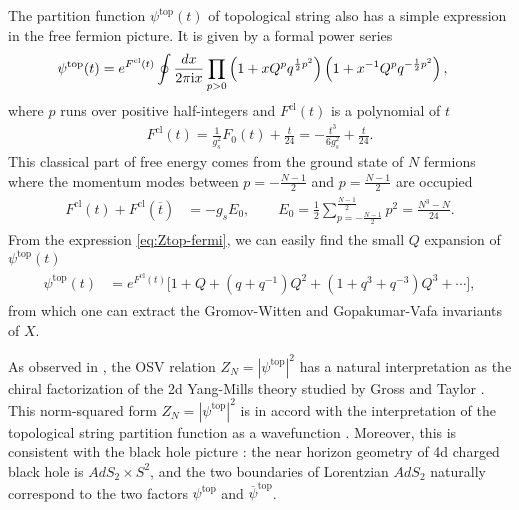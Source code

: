 \documentclass[11pt]{article}
\newcommand{\ri}{{\rm i}}
\newcommand{\hf}{\frac{1}{2}}
\def\b#1{\overline{#1}}
\renewcommand{\[}{\begin{eqnarray}}
\renewcommand{\]}{\end{eqnarray}}
\begin{document}
The partition function $\psi^{\text{top}}(t)$ of topological
string also 
has a simple expression in the free fermion picture.
It is
given by a formal power series \cite{Douglas:1993wy} 
\begin{align}
\psi^{\text{top}}(t)
 &= e^{F^{\text{cl}}(t)}
 \oint\frac{dx}{2\pi\ri x}
 \prod_{p>0}\left(1+xQ^p q^{\hf p^2}\right)
            \left(1+x^{-1}Q^p q^{-\hf p^2}\right),
\label{eq:Ztop-fermi}
\end{align}
where  $p$ runs over positive half-integers
and $F^{\text{cl}}(t)$ is a polynomial of $t$ 
\begin{align}
 F^{\text{cl}}(t)=\frac{1}{g_s^2}F_0(t)+\frac{t}{24}=-\frac{t^3}{6g_s^2}+\frac{t}{24}.
\label{eq:Fcl}
\end{align}
This classical part of free energy comes from 
the ground state of $N$ fermions where
the momentum modes between $p=-\frac{N-1}{2}$ and $p=\frac{N-1}{2}$ are occupied
\cite{Vafa:2004qa}
\begin{align}
 \begin{aligned}
  F^{\text{cl}}(t)+F^{\text{cl}}(\b{t})&=-g_sE_0,\qquad
E_0=\hf \sum_{p=-\frac{N-1}{2}}^{\frac{N-1}{2}}p^2
=\frac{N^3-N}{24}.
 \end{aligned}
\label{eq:Egnd}
\end{align} 
From the expression \eqref{eq:Ztop-fermi}, we can easily find the small $Q$ expansion of 
$\psi^{\text{top}}(t)$
\begin{align}
\begin{aligned}
\psi^{\text{top}}(t)
 &=e^{F^{\text{cl}}(t)}\Big[1+Q+(q+q^{-1})Q^2+(1+q^3+q^{-3})Q^3+\cdots\Big],
\end{aligned}
\label{eq:Ztop-Q}
\end{align}
from which one can extract the Gromov-Witten 
and Gopakumar-Vafa invariants of $X$.

As observed in \cite{Vafa:2004qa},
the OSV relation $Z_N=|\psi^{\text{top}}|^2$
has a natural interpretation 
as the chiral factorization of the 2d Yang-Mills theory
studied by Gross and Taylor \cite{Gross:1992tu,Gross:1993hu}.
This norm-squared form $Z_N=|\psi^{\text{top}}|^2$ is in accord with
the interpretation of the topological string partition function as
a wavefunction \cite{Witten:1993ed,Ooguri:2005vr}.
Moreover, 
this is consistent with the black hole picture \cite{Vafa:2004qa}:
the near horizon geometry of 4d charged black hole is $AdS_2\times S^2$,
and the two boundaries of Lorentzian $AdS_2$ naturally correspond to the two factors
$\psi^{\text{top}}$ and $\b{\psi}^{\text{top}}$.
\end{document}
